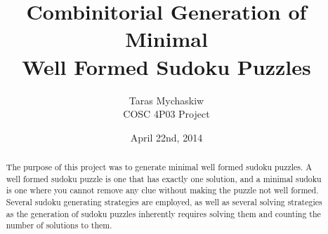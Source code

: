 \documentclass[12pt]{article}
\title{Combinitorial Generation of Minimal\\Well Formed Sudoku Puzzles}
\author{Taras Mychaskiw\\COSC 4P03 Project}
\date{April 22nd, 2014}
\begin{document}
\maketitle
    \begin{abstract}
    The purpose of this project was to generate minimal well formed sudoku puzzles. A well formed sudoku puzzle is one that has
    exactly one solution, and a minimal sudoku is one where you cannot remove any clue without making the puzzle not well formed.
    Several sudoku generating strategies are employed, as well as several solving strategies as the generation of sudoku puzzles
    inherently requires solving them and counting the number of solutions to them.
    \end{abstract}

    \thispagestyle{empty}
    \setcounter{tocdepth}{2}
    \tableofcontents
    \thispagestyle{empty}
    \mbox{}
    \clearpage
    \setcounter{page}{1}
    
    
    
    
    
    
    
    
    
    
\end{document}
